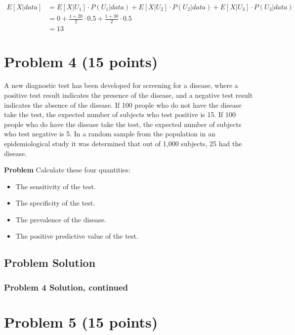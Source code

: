 \documentclass[12pt]{article}
\theoremstyle{definition}
\begin{document}
\begin{align*}
E[X|data] &= E[X|U_1] \cdot P(U_1|data) + E[X|U_2] \cdot P(U_2|data) + E[X|U_3] \cdot P(U_3|data)\\
&= 0 +  \frac{1 + 20}{2} \cdot 0.5 +  \frac{1 + 30}{2} \cdot 0.5\\
&= 13
\end{align*}











\newpage
\section*{Problem 4 (15 points)}

A new diagnostic test has been developed for screening for a disease, where a positive test result indicates the presence of the disease, and a negative test result indicates the absence of the disease. If 100 people who do not have the disease take the test, the expected number of subjects who test positive is 15. If 100 people who do have the disease take the test, the expected number of subjects who test negative is 5. In a random sample from the population in an epidemiological study it was determined that out of 1,000 subjects, 25 had the disease.

\bigskip
\noindent
{\bf Problem} Calculate these four quantities:
\begin{itemize}
	\item The sensitivity of the test.
	\item The specificity of the test.
	\item The prevalence of the disease.
	\item The positive predictive value of the test.
\end{itemize}

\subsection*{Problem Solution}


	
\newpage
\subsubsection*{Problem 4 Solution, continued}


\newpage
\section*{Problem 5 (15 points)}
\end{document}
